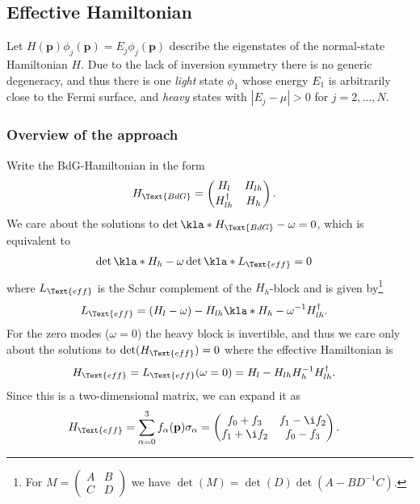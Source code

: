 \documentclass[english, parskip=full]{scrartcl}
\begin{document}
\subsection{Effective Hamiltonian}
Let $H(\textbf{p}) \phi_j(\textbf{p}) = E_j \phi_j(\textbf{p})$ describe the eigenstates of the normal-state Hamiltonian $H$.
Due to the lack of inversion symmetry there is no generic degeneracy, and thus there is one \emph{light} state $\phi_1$ whose energy $E_1$ is arbitrarily close to the Fermi surface, and \emph{heavy} states with $|E_j - \mu| > 0$ for $j=2,\dots,N$.
\subsubsection{Overview of the approach}
Write the BdG-Hamiltonian in the form
\begin{align}
H_\Text{BdG} &= \begin{pmatrix}
H_l & H_{lh} \\ H_{lh}^\dagger & H_h
\end{pmatrix}.
\end{align}
We care about the solutions to $\det \kla*{H_\Text{BdG} - \omega} = 0$, which is equivalent to
\begin{align}
\det\kla*{H_h - \omega} \det \kla*{L_\Text{eff}} &= 0
\end{align}
where $L_\Text{eff}$ is the Schur complement of the $H_h$-block and is given by\footnote{For $M=\begin{pmatrix}
A & B \\ C & D
\end{pmatrix}$ we have $\det(M) = \det (D) \det (A - BD^{-1}C)$.}
\begin{align}
L_\Text{eff} &= (H_l - \omega) - H_{lh} \kla*{H_h-\omega}^{-1} H_{lh}^\dagger.
\end{align}
For the zero modes ($\omega=0$) the heavy block is invertible, and thus we care only about the solutions to $\det (H_\Text{eff}) = 0$ where the effective Hamiltonian is
\begin{align}
H_\Text{eff} &= L_\Text{eff}(\omega=0) = H_l - H_{lh} H_h^{-1} H_{lh}^\dagger.
\end{align}
Since this is a two-dimensional matrix, we can expand it as
\begin{align}
H_\Text{eff} &= \sum_{\alpha=0}^3 f_\alpha (\textbf{p}) \sigma_\alpha = \begin{pmatrix}
f_0 + f_3 & f_1 -\i f_2 \\ f_1 + \i f_2 & f_0 - f_3
\end{pmatrix}.
\end{align}
\end{document}
